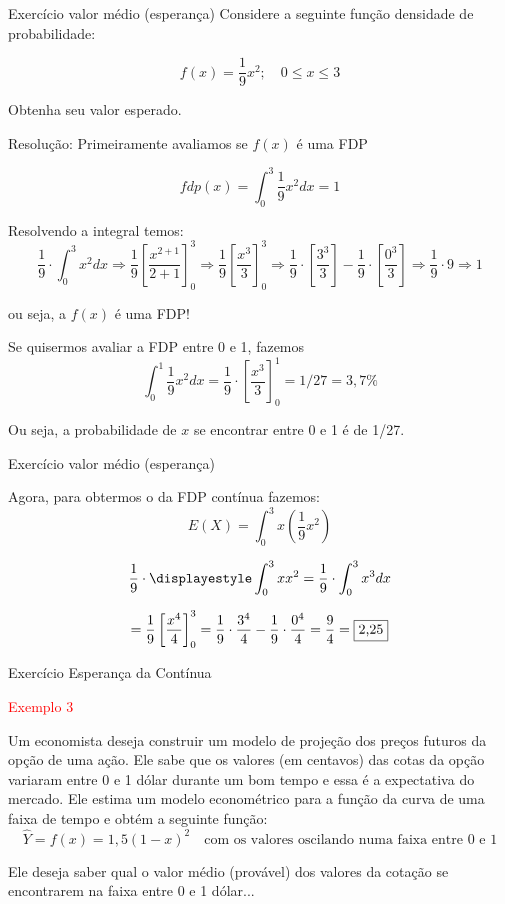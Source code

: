 \documentclass{beamer}
\begin{document}
\begin{frame}{Exercício valor médio (esperança)}\label{Exercvalmedio}
\footnotesize
Considere a seguinte função densidade de probabilidade:

$$
f(x)=\frac{1}{9}x^{2};\quad 0\leq x \leq 3
$$

Obtenha seu valor esperado.


Resolução: Primeiramente avaliamos se $f(x)$ é uma FDP

$$
fdp(x)= \displaystyle\int_{0}^{3}\frac{1}{9}x^{2}dx=1
$$

Resolvendo a integral temos:
$$
\frac{1}{9}\cdot \int _0^3x^2dx\Rightarrow\frac{1}{9}\left[\frac{x^{2+1}}{2+1}\right]^3_0\Rightarrow \frac{1}{9}\left[\frac{x^3}{3}\right]^3_0\Rightarrow\frac{1}{9}\cdot\left[\frac{3^3}{3}\right]-\frac{1}{9}\cdot\left[\frac{0^3}{3}\right]\Rightarrow\frac{1}{9}\cdot 9\Rightarrow 1
$$

ou seja, a $f(x)$ é uma FDP!
 
 
Se quisermos avaliar a FDP entre 0 e 1, fazemos $$
\displaystyle\int^{1}_{0}\frac{1}{9}x^{2}dx=\frac{1}{9}\cdot \left[\frac{x^3}{3}\right]^1_0=1/27=3,7\%
$$

Ou seja, a probabilidade de $x$ se encontrar entre 0 e 1 é de 1/27.
\end{frame}
\begin{frame}{Exercício valor médio (esperança)}

Agora, para obtermos o  da FDP contínua fazemos:
$$
E(X)=\displaystyle\int^{3}_{0}x\left(\frac{1}{9}x^{2}\right)
$$

$$
\frac{1}{9}\cdot\displayestyle\int_{0}^{3}xx^{2}=\frac{1}{9}\cdot \int _0^3x^3dx
$$

$$
=\frac{1}{9}\left[\frac{x^{4}}{4}\right]^3_0=\frac{1}{9}\cdot \frac{3^4}{4}-\frac{1}{9}\cdot\frac{0^4}{4}=\frac{9}{4}=\fbox{2,25}
$$


\end{frame}
\begin{frame}{Exercício Esperança da Contínua}

\footnotesize
\textcolor{red}{Exemplo 3}

Um economista deseja construir um modelo de projeção dos preços futuros da opção de uma ação. Ele sabe que os valores (em centavos) das cotas da opção variaram entre 0 e 1 dólar durante um bom tempo e essa é a expectativa do mercado. Ele estima um modelo econométrico para a função da curva de uma faixa de tempo e obtém a seguinte função:
$$
\widehat{Y}=f(x)=1,5(1-x)^2\quad\mbox{com os valores oscilando numa faixa entre 0 e 1}
$$

Ele deseja saber qual o valor médio (provável) dos valores da cotação se encontrarem na faixa entre 0 e 1 dólar...

\end{frame}
\end{document}

